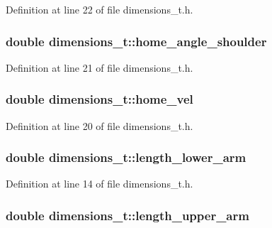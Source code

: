 \-Definition at line 22 of file dimensions\-\_\-t.\-h.

\subsubsection[{home\-\_\-angle\-\_\-shoulder}]{\setlength{\rightskip}{0pt plus 5cm}double {\bf dimensions\-\_\-t\-::home\-\_\-angle\-\_\-shoulder}}\label{classdimensions__t_ab691e28215e6bee2c8f606e3be6111e0}


\-Definition at line 21 of file dimensions\-\_\-t.\-h.

\subsubsection[{home\-\_\-vel}]{\setlength{\rightskip}{0pt plus 5cm}double {\bf dimensions\-\_\-t\-::home\-\_\-vel}}\label{classdimensions__t_ae5ef49978939430a39c218507a52a67a}


\-Definition at line 20 of file dimensions\-\_\-t.\-h.

\subsubsection[{length\-\_\-lower\-\_\-arm}]{\setlength{\rightskip}{0pt plus 5cm}double {\bf dimensions\-\_\-t\-::length\-\_\-lower\-\_\-arm}}\label{classdimensions__t_a60695ec1a7f252dd2c22bd785d0a4c0e}


\-Definition at line 14 of file dimensions\-\_\-t.\-h.

\subsubsection[{length\-\_\-upper\-\_\-arm}]{\setlength{\rightskip}{0pt plus 5cm}double {\bf dimensions\-\_\-t\-::length\-\_\-upper\-\_\-arm}}\label{classdimensions__t_a5746b23dd5459004cf742339e0baf93d}


